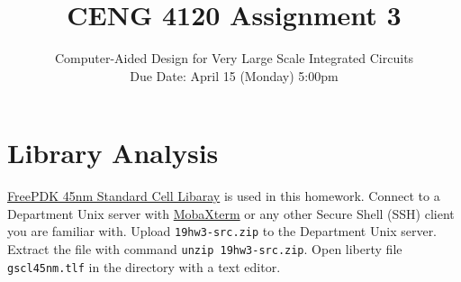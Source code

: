 \documentclass[acmlarge,screen=true,anonymous=false,11pt]{acmart}
\begin{document}
\title{CENG 4120 Assignment 3}
\subtitle{Computer-Aided Design for Very Large Scale Integrated Circuits \\ Due Date: April 15 (Monday) 5:00pm}

\maketitle

\section{Library Analysis}
\href{https://www.eda.ncsu.edu/wiki/FreePDK45:Contents}{FreePDK 45nm Standard Cell Libaray}
is used in this homework.
Connect to a Department Unix server with
\href{https://download.mobatek.net/1112019010310554/MobaXterm_Portable_v11.1.zip}{MobaXterm}
or any other Secure Shell (SSH) client you are familiar with.
Upload \texttt{19hw3-src.zip} to the Department Unix server.
Extract the file with command \texttt{unzip 19hw3-src.zip}.
Open liberty file \texttt{gscl45nm.tlf} in the directory with a text editor.
\end{document}
